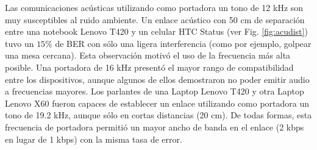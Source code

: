 Las comunicaciones acústicas utilizando como portadora un tono de 12 kHz son muy susceptibles al ruido ambiente. Un enlace acústico con 50 cm de separación entre una notebook Lenovo T420 y un celular HTC Status (ver Fig. \ref{fig:acudist}) tuvo un $15\%$ de BER con sólo una ligera interferencia (como por ejemplo, golpear una mesa cercana). Esta observación motivó el uso de la frecuencia más alta posible. Una portadora de 16 kHz presentó el mayor rango de compatibilidad entre los dispositivos, aunque algunos de ellos demostraron no poder emitir audio a frecuencias mayores.
Los parlantes de una Laptop Lenovo T420 y otra Laptop Lenovo X60 fueron capaces de establecer un enlace utilizando como portadora un tono de 19.2 kHz, aunque sólo en cortas distancias (20 cm). De todas formas, esta frecuencia de portadora permitió un mayor ancho de banda en el enlace (2 kbps en lugar de 1 kbps) con la misma tasa de error.

%
